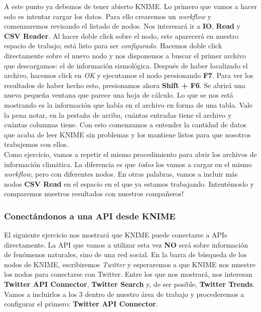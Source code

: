 \documentclass[10pt,letterpaper]{article}
\begin{document}
A este punto ya debemos de tener abierto KNIME. Lo primero que vamos a hacer solo es intentar cargar los datos. Para ello crearemos un \emph{workflow} y comenzaremos revisando el listado de nodos. Nos interesar\'a ir a \textbf{IO}, \textbf{Read} y \textbf{CSV Reader}. Al hacer doble click sobre el nodo, este aparecer\'a en nuestro espacio de trabajo; est\'a listo para ser \emph{configurado}. Hacemos doble click directamente sobre el nuevo nodo y nos disponemos a buscar el primer archivo que descargamos: el de informaci\'on sismol\'ogica. Despu\'es de haber localizado el archivo, hacemos click en \emph{OK} y ejecutamos el nodo presionando \textbf{F7}. Para ver los resultados de haber hecho esto, presionamos ahora \textbf{Shift + F6}. Se abrir\'a una nueva peque\~na ventana que parece una hoja de c\'alculo. Lo que se nos est\'a mostrando es la informaci\'on que hab\'ia en el archivo en forma de una tabla. Vale la pena notar, en la pesta\~na de arriba, cu\'antas entradas tiene el archivo y cu\'antas columnas tiene. Con esto comenzamos a entender la cantidad de datos que acaba de leer KNIME sin problemas y los mantiene listos para que nosotros trabajemos con ellos.\\

Como ejercicio, vamos a repetir el mismo procedimiento para abrir los archivos de informaci\'on clim\'atica. La diferencia es que \emph{todos} los vamos a cargar en el mismo \emph{workflow}, pero con diferentes nodos. En otras palabras, vamos a incluir m\'as nodos \textbf{CSV Read} en el espacio en el que ya estamos trabajando. Intent\'emoslo y comparemos nuestros resultados con nuestros compa\~neros!

\subsubsection{Conect\'andonos a una API desde KNIME}
El siguiente ejercicio nos mostrar\'a que KNIME puede conectarse a APIs directamente. La API que vamos a utilizar esta vez \textbf{NO} ser\'a sobre informaci\'on de fen\'omenos naturales, sino de una red social. En la barra de b\'usqueda de los nodos de KNIME, escribiremos \emph{Twitter} y esperaremos a que KNIME nos muestre los nodos para conectarse con Twitter. Entre los que nos mostrar\'a, nos interesan \textbf{Twitter API Connector}, \textbf{Twitter Search} y, de ser posible, \textbf{Twitter Trends}. Vamos a incluirlos a los 3 dentro de nuestro \'area de trabajo y procederemos a configurar el primero: \textbf{Twitter API Connector}.\\
\end{document}
